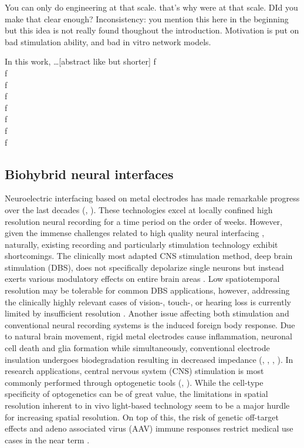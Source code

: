 You can only do engineering at that scale. that's why were at that scale. DId
you make that clear enough? Inconsistency:  you mention this here in the
beginning but this idea is not really found thoughout the introduction.
Motivation is put on bad stimulation ability, and bad in vitro network models. 

In this work, \dots [abstract like but shorter]
f\\
f\\
f\\
f\\
f\\
f\\
f\\
f\\


\subsection{Biohybrid neural interfaces}
Neuroelectric interfacing based on metal electrodes has made remarkable progress
over the last decades (\cite{utaharray}, \cite{neuropixel}). These technologies
excel at locally confined high resolution neural recording for a time period on
the order of weeks. However, given the immense challenges related to high
quality neural interfacing \parencite{mooreslaw}, naturally, existing recording
and particularly stimulation technology exhibit shortcomings.
The clinically most adapted CNS stimulation method, deep brain stimulation
(DBS), does not specifically depolarize single neurons but instead exerts
various modulatory effects on entire brain areas \parencite{dbs}. Low
spatiotemporal resolution may be tolerable for common DBS applications, however,
addressing the clinically highly relevant cases of vision-, touch-, or hearing
loss is currently limited by insufficient resolution
\parencite{retinastimulation}. Another issue affecting both stimulation and
conventional neural recording systems is the induced foreign body response. Due
to natural brain movement, rigid metal electrodes cause inflammation, neuronal
cell death and glia formation while simultaneously, conventional electrode
insulation undergoes biodegradation resulting in decreased impedance
(\cite{eletrodeproblems1}, \cite{eletrodeproblems2}, \cite{eletrodeproblems3},
\cite{eletrodeproblems4}). In research applications, central nervous system
(CNS) stimulation is most commonly performed through optogenetic tools
(\cite{optog1}, \cite{optog2}). While the cell-type specificity of optogenetics
can be of great value, the limitations in spatial resolution inherent to in vivo
light-based technology seem to be a major hurdle for increasing spatial
resolution. On top of this, the risk of genetic off-target effects and adeno
associated virus (AAV) immune responses restrict medical use cases in the near
term \parencite{optogImmunresponse}. \\

